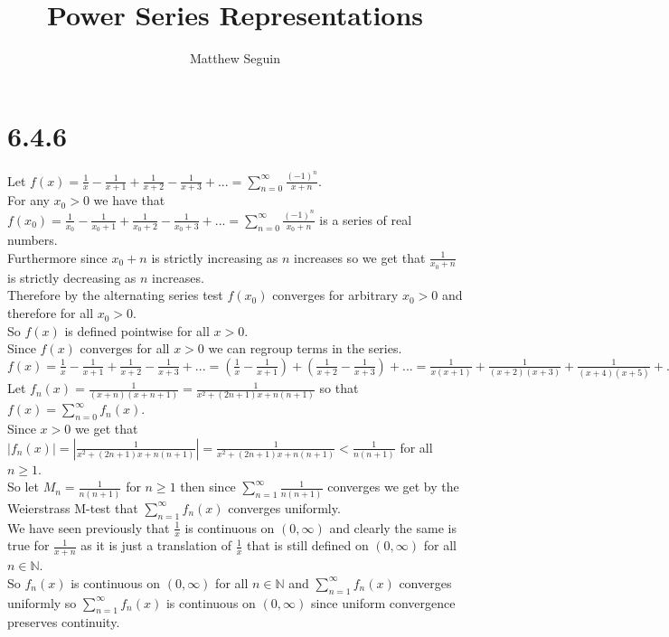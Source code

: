 \documentclass{article}
\title{Power Series Representations}
\author{Matthew Seguin}
\date{}
\begin{document}
\maketitle

\section*{6.4.6}
\begin{center}
    \doublespacing
    Let $f(x) =\frac{1}{x} -\frac{1}{x+1} +\frac{1}{x+2} -\frac{1}{x+3} + ... =\sum _{n=0}^{\infty}\frac{(-1)^n}{x + n}$.
    \\For any $x_0 > 0$ we have that $f(x_0) =\frac{1}{x_0} -\frac{1}{x_0 +1} +\frac{1}{x_0 +2} -\frac{1}{x_0 +3} + ... =\sum _{n=0}^{\infty}\frac{(-1)^n}{x_0 + n}$ is a series of real numbers.
    \\Furthermore since $x_0 + n$ is strictly increasing as $n$ increases so we get that $\frac{1}{x_0 + n}$ is strictly decreasing as $n$ increases.
    \\Therefore by the alternating series test $f(x_0)$ converges for arbitrary $x_0 > 0$ and therefore for all $x_0 > 0$.
    \\So $f(x)$ is defined pointwise for all $x > 0$.
    \\Since $f(x)$ converges for all $x > 0$ we can regroup terms in the series.
    \\$f(x) =\frac{1}{x} -\frac{1}{x+1} +\frac{1}{x+2} -\frac{1}{x+3} + ... = (\frac{1}{x} -\frac{1}{x+1}) +(\frac{1}{x+2} -\frac{1}{x+3}) + ... =\frac{1}{x (x + 1)} +\frac{1}{(x+2)(x+3)} +\frac{1}{(x+4)(x+5)} + ...$
    \\Let $f_n (x) =\frac{1}{(x+n)(x+n+1)} =\frac{1}{x^2 + (2n+1)x + n(n+1)}$ so that $f(x) =\sum _{n=0}^{\infty} f_n (x)$.
    \\Since $x > 0$ we get that $|f_n (x)| =|\frac{1}{x^2 + (2n+1)x + n(n+1)}| =\frac{1}{x^2 + (2n+1)x + n(n+1)} <\frac{1}{n(n+1)}$ for all $n\geq 1$.
    \\So let $M_n =\frac{1}{n(n+1)}$ for $n\geq 1$ then since $\sum _{n=1}^{\infty}\frac{1}{n(n+1)}$ converges we get by the Weierstrass M-test that $\sum _{n=1}^{\infty} f_n (x)$ converges uniformly.
    \\We have seen previously that $\frac{1}{x}$ is continuous on $(0,\infty )$ and clearly the same is true for $\frac{1}{x+n}$ as it is just a translation of $\frac{1}{x}$ that is still defined on $(0,\infty )$ for all $n\in\mathbb{N}$.
    \\So $f_n (x)$ is continuous on $(0,\infty )$ for all $n\in\mathbb{N}$ and $\sum _{n=1}^{\infty} f_n (x)$ converges uniformly so $\sum _{n=1}^{\infty} f_n (x)$ is continuous on $(0,\infty )$ since uniform convergence preserves continuity.

\end{center}
\end{document}
